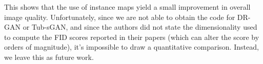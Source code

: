 This shows that the use of instance maps yield a small improvement in overall image quality.
Unfortunately, since we are not able to obtain the code for DR-GAN or Tub-sGAN, and since the authors did not state the dimensionality used to compute the FID scores reported in their papers (which can alter the score by orders of magnitude), it's impossible to draw a quantitative comparison.
Instead, we leave this as future work.
